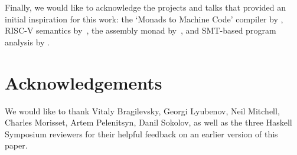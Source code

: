 
Finally, we would like to acknowledge the projects and talks
that provided an initial inspiration for this work: the `Monads to Machine
Code' compiler by \citet{diehl-monads-to-machines}, \mbox{RISC-V} semantics
by~\citet{riscv-semantics}, the assembly monad by~\citet{asm-monad}, and
SMT-based program analysis by \citet{haskell-z3}.

\section*{Acknowledgements}
We would like to thank Vitaly Bragilevsky, Georgi Lyubenov, Neil Mitchell, Charles Morisset,
Artem Pelenitsyn, Danil Sokolov, as well as the three Haskell Symposium
reviewers for their helpful feedback on an earlier version of this paper.